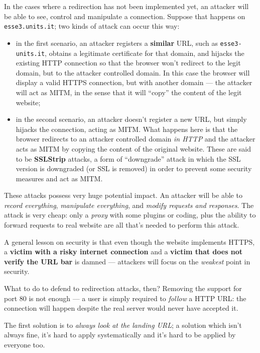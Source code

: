 \documentclass[10pt]{\classname}
\begin{document}
In the cases where a redirection has not been implemented yet, an attacker will
be able to see, control and manipulate a connection. Suppose that happens on
\texttt{esse3.\-units.it}; two kinds of attack can occur this way:
\begin{itemize}
    \item in the first scenario, an attacker registers a \textbf{similar} URL,
        such as \texttt{esse3\--units.it}, obtains a legitimate certificate for
        that domain, and hijacks the existing HTTP connection so that the
        browser won't redirect to the legit domain, but to the attacker
        controlled domain. In this case the browser will display a valid HTTPS
        connection, but with another domain --- the attacker will act as MITM,
        in the sense that it will ``copy'' the content of the legit website;
    \item in the second scenario, an attacker doesn't register a new URL, but
        simply hijacks the connection, acting as MITM. What happens here is
        that the browser redirects to an attacker controlled domain \emph{in
        HTTP} and the attacker acts as MITM by copying the content of the
        original website. These are said to be \textbf{SSLStrip} attacks, a form
        of ``downgrade'' attack in which the SSL version is downgraded (or SSL
        is removed) in order to prevent some security measures and act as MITM.
\end{itemize}

These attacks possess very huge potential impact. An attacker will be able to
\emph{record everything}, \emph{manipulate everything}, and \emph{modify
requests and responses}. The attack is very cheap: only a \emph{proxy} with
some plugins or coding, plus the ability to forward requests to real website
are all that's needed to perform this attack.

A general lesson on security is that even though the website implements HTTPS,
a \textbf{victim with a risky internet connection} and a \textbf{victim that
does not verify the URL bar} is damned --- attackers will focus on the
\emph{weakest} point in security.

What to do to defend to redirection attacks, then?
Removing the support for port $80$ is not enough --- a user is simply required
to \emph{follow} a HTTP URL: the connection will happen despite the real server
would never have accepted it. 

The first solution is to \emph{always look at the landing URL}; a solution
which isn't always fine, it's hard to apply systematically and it's hard to be
applied by everyone too.
\end{document}
